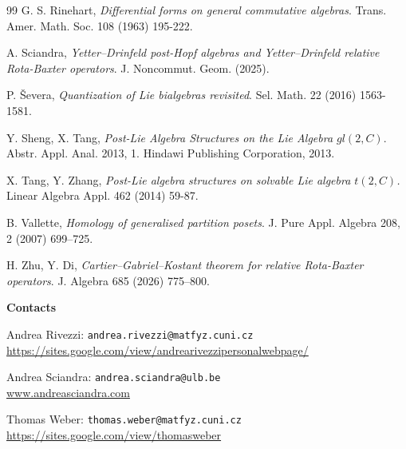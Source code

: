 \documentclass[10pt]{article}
\theoremstyle{definition}
\begin{document}
\begin{thebibliography}{99}
G. S. Rinehart, 
\emph{Differential forms on general commutative algebras}. 
Trans. Amer. Math. Soc. 108 (1963) 195-222.

A. Sciandra, 
\emph{Yetter--Drinfeld post-Hopf algebras and Yetter--Drinfeld relative Rota-Baxter operators}.
J. Noncommut. Geom. (2025).

P. \v{S}evera, \emph{Quantization of Lie bialgebras revisited}. Sel. Math. 22 (2016) 1563-1581.

Y. Sheng, X. Tang, \emph{Post-Lie Algebra Structures on the Lie Algebra $gl (2, C)$}. Abstr. Appl. Anal. 2013, 1. Hindawi Publishing Corporation, 2013.


X. Tang, Y. Zhang, \emph{Post-Lie algebra structures on solvable Lie algebra $t(2, C)$.} Linear Algebra Appl. 462 (2014) 59-87.

B. Vallette, 
\emph{Homology of generalised partition posets}. J. Pure Appl. Algebra 208, 2 (2007) 699--725.

H. Zhu, Y. Di, 
\emph{Cartier--Gabriel--Kostant theorem for relative
Rota-Baxter operators}. J. Algebra 685 (2026) 775--800.

\end{thebibliography}

\bigskip
\noindent\textbf{Contacts}
\medskip

\noindent
Andrea Rivezzi:
\texttt{andrea.rivezzi@matfyz.cuni.cz}\\
\url{https://sites.google.com/view/andrearivezzipersonalwebpage/}

\medskip
\noindent
Andrea Sciandra: \texttt{andrea.sciandra@ulb.be}\\
\url{www.andreasciandra.com}

\medskip
\noindent
Thomas Weber: \texttt{thomas.weber@matfyz.cuni.cz}\\
\url{https://sites.google.com/view/thomasweber}
\end{document}
